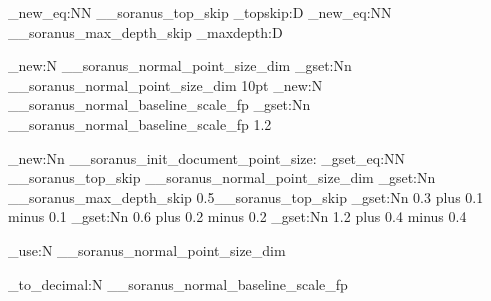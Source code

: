 %

%

\cs_new_eq:NN \g__soranus_top_skip \tex_topskip:D
\cs_new_eq:NN \g__soranus_max_depth_skip \tex_maxdepth:D

\dim_new:N \g__soranus_normal_point_size_dim
\dim_gset:Nn \g__soranus_normal_point_size_dim {10pt}
\fp_new:N \g__soranus_normal_baseline_scale_fp
\fp_gset:Nn \g__soranus_normal_baseline_scale_fp {1.2}


%

\cs_new:Nn \__soranus_init_document_point_size:
  {
    \dim_gset_eq:NN \g__soranus_top_skip \g__soranus_normal_point_size_dim
    \dim_gset:Nn \g__soranus_max_depth_skip {0.5\g__soranus_top_skip}
    \skip_gset:Nn \smallskipamount
      {
         {0.3}
        plus  {0.1}
        minus  {0.1}
      }
    \skip_gset:Nn \medskipamount
      {
         {0.6}
        plus  {0.2}
        minus  {0.2}
      }
    \skip_gset:Nn \bigskipamount
      {
         {1.2}
        plus  {0.4}
        minus  {0.4}
      }
  }


%

\NewDocumentCommand \NormalPointSize {}
  {\dim_use:N \g__soranus_normal_point_size_dim}

\NewDocumentCommand \NormalBaselineScale {}
  {\fp_to_decimal:N \g__soranus_normal_baseline_scale_fp}





%

